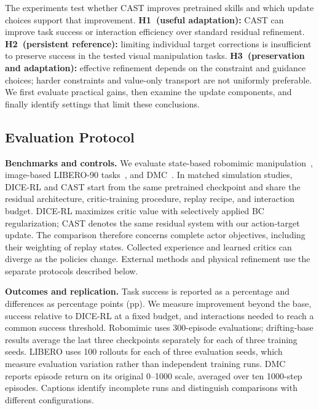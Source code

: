 
The experiments test whether CAST improves pretrained skills and which
update choices support that improvement.
\textbf{H1~(useful adaptation):} CAST can improve task success or
interaction efficiency over standard residual refinement.
\textbf{H2~(persistent reference):} limiting individual target corrections
is insufficient to preserve success in the tested visual manipulation tasks.
\textbf{H3~(preservation and adaptation):} effective refinement depends on
the constraint and guidance choices; harder constraints and value-only
transport are not uniformly preferable.
We first evaluate practical gains, then examine the update components,
and finally identify settings that limit these conclusions.

\subsection{Evaluation Protocol}
\label{sec:exp-setup}

\textbf{Benchmarks and controls.}
We evaluate state-based robomimic manipulation~\cite{mandlekar2021robomimic},
image-based LIBERO-90 tasks~\cite{liu2023libero}, and
DMC~\cite{tassa2018dmc}. In matched simulation studies, DICE-RL and CAST
start from the same pretrained checkpoint and share the residual
architecture, critic-training procedure, replay recipe, and interaction
budget. DICE-RL maximizes critic value with selectively applied BC
regularization; CAST denotes the same residual system with our action-target
update. The comparison therefore concerns complete actor objectives,
including their weighting of replay states. Collected experience and
learned critics can diverge as the policies change. External methods
and physical refinement use the separate protocols described below.

\textbf{Outcomes and replication.}
Task success is reported as a percentage and differences as percentage
points (pp). We measure improvement beyond the base, success relative to
DICE-RL at a fixed budget, and interactions needed to reach a common
success threshold. Robomimic uses 300-episode evaluations; drifting-base
results average the last three checkpoints separately for each of three
training seeds. LIBERO uses 100 rollouts for each of three evaluation
seeds, which measure evaluation variation rather than independent
training runs. DMC reports episode return on its original 0--1000 scale,
averaged over ten 1000-step episodes. Captions identify incomplete runs
and distinguish comparisons with different configurations.

